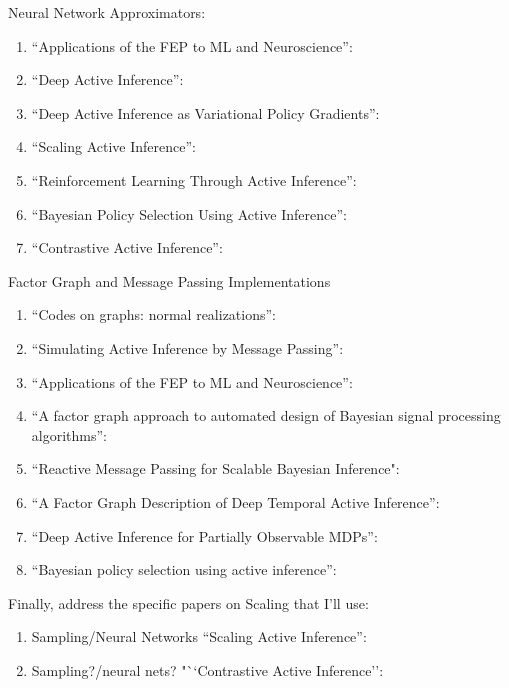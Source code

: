 \documentclass[12pt, oneside]{article}
\begin{document}
Neural Network Approximators:
\begin{enumerate}
	\item ``Applications of the FEP to ML and Neuroscience'': \textcite{Applications-of-FEP-Machine-Learning-Neuroscience}
	\item ``Deep Active Inference'': \textcite{Deep-AIF}
	\item ``Deep Active Inference as Variational Policy Gradients'': \textcite{Deep-AIF-As-Var-Policy-Grad}
	\item ``Scaling Active Inference'': \textcite{Scaling-AIF}
	\item ``Reinforcement Learning Through Active Inference'': \textcite{Reinforcement-Learning-Through-AIF}
	\item ``Bayesian Policy Selection Using Active Inference'': \textcite{Bayesian-Policy-Selection-Using-AIF}
	\item ``Contrastive Active Inference'': \textcite{Contrastive-AIF}
\end{enumerate}

Factor Graph and Message Passing Implementations
\begin{enumerate}
	\item ``Codes on graphs: normal realizations'': \textcite{Codes-on-Graphs}
	\item ``Simulating Active Inference by Message Passing'': \textcite{Simulating-AIF-By-Message-Passing}
	\item ``Applications of the FEP to ML and Neuroscience'': \textcite{Applications-of-FEP-Machine-Learning-Neuroscience}
	\item ``A factor graph approach to automated design of Bayesian signal processing algorithms'': \textcite{Factor-Graph-Approach-Automated-Design-Bayesian-Algos}
	\item ``Reactive Message Passing for Scalable Bayesian Inference": \textcite{Reactive-MP}
	\item ``A Factor Graph Description of Deep Temporal Active Inference'': \textcite{Factor-Graph-Desc-Deep-Temp-AIF}
	\item ``Deep Active Inference for Partially Observable MDPs'': \textcite{DEEP-AIF-For-POMDPs}
	\item ``Bayesian policy selection using active inference'': \textcite{Bayesian-Policy-Selection-AIF}
\end{enumerate}

Finally, address the specific papers on Scaling that I'll use:
\begin{enumerate}
	\item Sampling/Neural Networks ``Scaling Active Inference'': \textcite{Scaling-AIF}
	\item Sampling?/neural nets? "``Contrastive Active Inference'': \textcite{Contrastive-AIF}
\end{enumerate}
\end{document}

